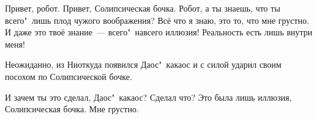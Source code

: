 \begin{dialog}
\X Привет, робот.
\R Привет, Солипсическая бочка.
\X Робот, а ты знаешь, что ты всего"~лишь плод чужого воображения?
\R Всё что я знаю, это то, что мне грустно.
\X И даже это твоё знание~--- всего"~навсего иллюзия! Реальность есть лишь внутри меня!
\end{dialog}

\begin{monolog}
Неожиданно, из Ниоткуда появился Даос"~какаос и с силой ударил своим посохом по Солипсической бочке.
\end{monolog}

\begin{dialog}
\R И зачем ты это сделал, Даос"~какаос?
\Y Сделал что? Это была лишь иллюзия, Солипсическая бочка.
\R Мне грустно.
\end{dialog}